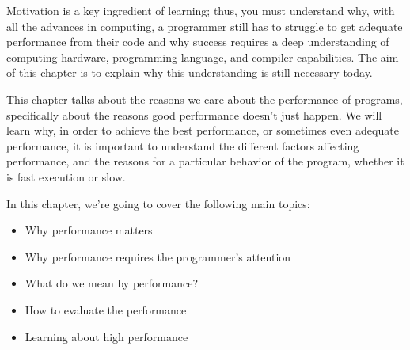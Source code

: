 Motivation is a key ingredient of learning; thus, you must understand why, with all the advances in computing, a programmer still has to struggle to get adequate performance from their code and why success requires a deep understanding of computing hardware, programming language, and compiler capabilities. The aim of this chapter is to explain why this understanding is still necessary today.

This chapter talks about the reasons we care about the performance of programs, specifically about the reasons good performance doesn't just happen. We will learn why, in order to achieve the best performance, or sometimes even adequate performance, it is important to understand the different factors affecting performance, and the reasons for a particular behavior of the program, whether it is fast execution or slow.

In this chapter, we're going to cover the following main topics:

\begin{itemize}
\item Why performance matters
\item Why performance requires the programmer's attention
\item What do we mean by performance?
\item How to evaluate the performance
\item Learning about high performance
\end{itemize}














